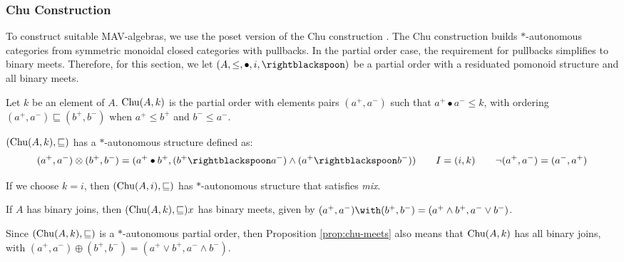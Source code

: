 \subsubsection{Chu Construction}
\label{sec:chu}

To construct suitable MAV-algebras, we use the poset version of the
Chu construction \cite{barr}. The Chu construction builds
$*$-autonomous categories from symmetric monoidal closed categories
with pullbacks. In the partial order case, the requirement for
pullbacks simplifies to binary meets. Therefore, for this section, we
let $(A, \leq, \bullet, i, \rightblackspoon)$ be a partial order with
a residuated pomonoid structure and all binary meets.

\begin{definition}\label{defn:chu}
  Let $k$ be an element of $A$. $\mathrm{Chu}(A, k)$ is the partial order with
  elements pairs $(a^+, a^-)$ such that $a^+ \bullet a^- \leq k$, with
  ordering $(a^+,a^-) \sqsubseteq (b^+, b^-)$ when $a^+ \leq b^+$ and
  $b^- \leq a^-$.
\end{definition}

\begin{proposition}
  $(\mathrm{Chu}(A, k), \sqsubseteq)$ has a $*$-autonomous structure defined
  as:
  \begin{displaymath}
    (a^+, a^-) \otimes (b^+, b^-) = (a^+ \bullet b^+, (b^+ \rightblackspoon a^-) \land (a^+ \rightblackspoon b^-))
    \qquad
    I = (i, k)
    \qquad
    \lnot(a^+,a^-) = (a^-, a^+)
  \end{displaymath}
\end{proposition}

\begin{remark}
  If we choose $k = i$, then $(\mathrm{Chu}(A, i), \sqsubseteq)$ has
  $*$-autonomous structure that satisfies \emph{mix}.
\end{remark}

\begin{proposition}\label{prop:chu-meets}
  If $A$ has binary joins, then $(\mathrm{Chu}(A, k), \sqsubseteq) x$ has
  binary meets, given by
  $(a^+,a^-) \with (b^+,b^-) = (a^+ \land b^+, a^- \lor b^-)$.
\end{proposition}

\begin{remark}
  Since $(\mathrm{Chu}(A, k), \sqsubseteq)$ is a $*$-autonomous partial order,
  then Proposition \ref{prop:chu-meets} also means that $\mathrm{Chu}(A, k)$
  has all binary joins, with
  $(a^+, a^-) \oplus (b^+, b^-) = (a^+ \lor b^+, a^- \land b^-)$.
\end{remark}

